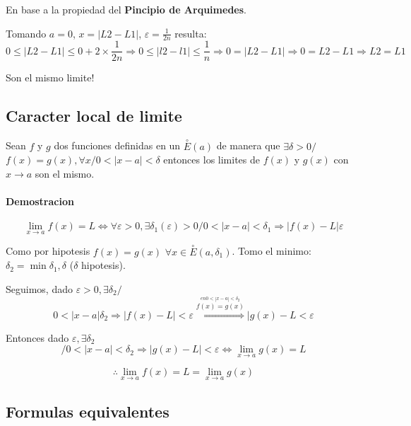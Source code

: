 En base a la propiedad del \textbf{Pincipio de Arquimedes}.
\begin{center}
\end{center}

Tomando $a=0$, $x=|L2-L1|$, $\varepsilon=\frac{1}{2n}$ resulta:
$$0\leq |L2-L1|\leq 0+ 2\times \frac{1}{2n} \Rightarrow 0\leq |l2-l1|\leq \frac{1}{n} \Rightarrow 0=|L2-L1|\Rightarrow 0=L2-L1 \Rightarrow L2=L1 $$
\begin{center}
Son el mismo limite!
\end{center}

\subsection{Caracter local de limite}

Sean $f$ y $g$ dos funciones definidas en un $\stackrel{\circ}{E}(a)$ de manera que $\exists \delta >0 /$ \\ $ f(x)=g(x), \forall x/0<|x-a|<\delta$ entonces los limites de $f(x)$ y $g(x)$ con $x\rightarrow a$ son el mismo.

\paragraph{Demostracion} 


$$\lim_{x\rightarrow a}{f(x)}=L \Leftrightarrow \forall \varepsilon>0, \exists \delta _1 (\varepsilon)>0/0<|x-a|< \delta _1 \Rightarrow |f(x)-L|\varepsilon$$

Como por hipotesis $f(x)=g(x)$ $\forall x\in \stackrel{\circ}{E}(a,\delta _1)$. Tomo el minimo: $\delta _2 = \min {\delta _1 , \delta}$ ($\delta$ hipotesis).

Seguimos, dado $\varepsilon>0, \exists \delta _2/$
$$0<|x-a|\delta _2 \Rightarrow |f(x)-L|< \varepsilon \stackrel{\stackrel{en 0<|x-a|<\delta _2}{f(x)=g(x)}}{\Rightarrow} |g(x)-L<\varepsilon$$

Entonces dado $\varepsilon, \exists \delta _2 $
$$/ 0<|x-a|<\delta _2 \Rightarrow |g(x)-L|<\varepsilon \Leftrightarrow \lim_{x \rightarrow a}{g(x)}=L$$

$$\therefore \lim_{x \rightarrow a}{f(x)}=L =\lim_{x \rightarrow a}{g(x)}$$

\subsection{Formulas equivalentes}

